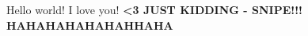 \documentclass[blue]{GL2020}
\begin{document}
\name{\bTest{}}

Hello world!  I love you! \bf{<3}
JUST KIDDING - SNIPE!!! HAHAHAHAHAHAHHAHA
\end{document}
